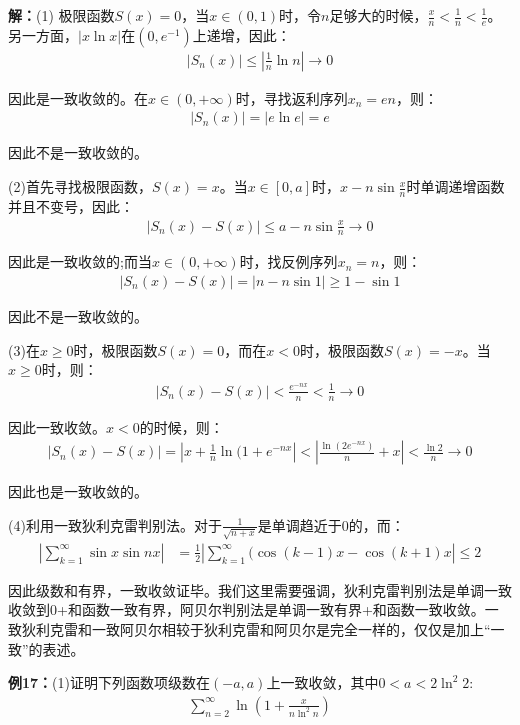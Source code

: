 \documentclass{ctexart}
\let\oldtextbf\textbf
\renewcommand{\textbf}[1]{\textcolor{brown!50!red}{\oldtextbf{#1}}}
\begin{document}
\textbf{\color{brown!50!red}解：}(1) 极限函数$S(x)=0$，当$x\in(0,1)$时，令$n$足够大的时候，$\frac{x}{n}<\frac{1}{n}<\frac{1}{e}$。另一方面，$|x\ln x|$在$(0,e^{-1})$上递增，因此：
\begin{align*}
    |S_n(x)|\leq|\frac{1}{n}\ln n|\to 0
\end{align*}

因此是一致收敛的。在$x\in(0,+\infty)$时，寻找返利序列$x_n=en$，则：
\begin{align*}
    |S_n(x)|=|e\ln e|=e
\end{align*}

因此不是一致收敛的。

(2)首先寻找极限函数，$S(x)=x$。当$x\in[0,a]$时，$x-n\sin \frac{x}{n}$时单调递增函数并且不变号，因此：
\begin{align*}
    |S_n(x)-S(x)|\leq a-n\sin\frac{x}{n}\to 0
\end{align*}

因此是一致收敛的;而当$x\in(0,+\infty)$时，找反例序列$x_n=n$，则：
\begin{align*}
    |S_n(x)-S(x)|=|n-n\sin 1|\geq 1-\sin 1
\end{align*}

因此不是一致收敛的。

(3)在$x\geq 0$时，极限函数$S(x)=0$，而在$x<0$时，极限函数$S(x)=-x$。当$x\geq 0$时，则：
\begin{align*}
    |S_n(x)-S(x)|<\frac{e^{-nx}}{n}<\frac{1}{n}\to 0
\end{align*}

因此一致收敛。$x<0$的时候，则：
\begin{align*}
    |S_n(x)-S(x)|=|x+\frac{1}{n}\ln(1+e^{-nx}|<|\frac{\ln(2e^{-nx})}{n}+x|<\frac{\ln 2}{n}\to 0
\end{align*}

因此也是一致收敛的。

(4)利用一致狄利克雷判别法。对于$\frac{1}{\sqrt{n+x}}$是单调趋近于0的，而：
\begin{align*}
    |\sum_{k=1}^\infty\sin x\sin nx|&=\frac{1}{2}|\sum_{k=1}^\infty(\cos(k-1)x-\cos(k+1)x|\leq 2
\end{align*}

因此级数和有界，一致收敛证毕。我们这里需要强调，狄利克雷判别法是单调一致收敛到0+和函数一致有界，阿贝尔判别法是单调一致有界+和函数一致收敛。一致狄利克雷和一致阿贝尔相较于狄利克雷和阿贝尔是完全一样的，仅仅是加上“一致”的表述。

\textbf{\color{brown!50!red}例17：}(1)证明下列函数项级数在$(-a,a)$上一致收敛，其中$0<a<2\ln^2 2$:
\begin{align*}
    \sum_{n=2}^\infty \ln(1+\frac{x}{n\ln^2n})
\end{align*}
\end{document}
